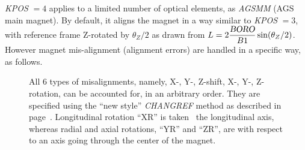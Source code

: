 {\begin{figure}[h]
\begin{center}
\end{center}
\end{figure}

\noindent \textsl{KPOS} $=4 $ applies to a limited number of optical elements, as 
\textsl{AGSMM} (AGS main magnet).  
By default, it aligns the magnet in a way similar 
to  \textsl{KPOS} $=3 $, with reference frame Z-rotated by $\theta_Z/2$ as drawn from $ L = 
2 \dfrac{\textsl{BORO}}{B1} \sin({\theta_Z}/{2})$. However magnet mis-alignment (alignment errors) are handled in a 
specific way, as follows. 



\begin{figure}[h]

\noindent All 6 types of misalignments, namely, X-, Y-, Z-shift, X-, Y-, Z-rotation, can be accounted for, in an arbitrary order. 
They are specified using the ``new style'' \textsl{CHANGREF} method as described in page~\pageref{CHANGREFNew}. 
Longitudinal rotation ``XR'' is taken \wrt\ the longitudinal axis, whereas radial and axial rotations, ``YR'' and ``ZR'', 
 are  with respect to an axis going through the center of the magnet. 

%
%


\end{figure}}
